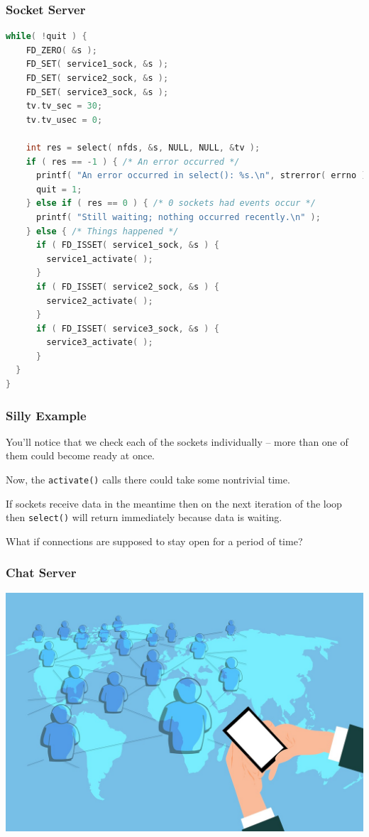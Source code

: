 \begin{frame}[fragile]
	\frametitle{Socket Server}

	\begin{lstlisting}[language=C]
while( !quit ) {
    FD_ZERO( &s );
    FD_SET( service1_sock, &s );
    FD_SET( service2_sock, &s );
    FD_SET( service3_sock, &s );
    tv.tv_sec = 30;
    tv.tv_usec = 0;
  
    int res = select( nfds, &s, NULL, NULL, &tv );
    if ( res == -1 ) { /* An error occurred */
      printf( "An error occurred in select(): %s.\n", strerror( errno ) );
      quit = 1;
    } else if ( res == 0 ) { /* 0 sockets had events occur */
      printf( "Still waiting; nothing occurred recently.\n" );
    } else { /* Things happened */
      if ( FD_ISSET( service1_sock, &s ) {
        service1_activate( ); 
      }
      if ( FD_ISSET( service2_sock, &s ) {
        service2_activate( ); 
      }
      if ( FD_ISSET( service3_sock, &s ) {
        service3_activate( ); 
      }
  }
}
\end{lstlisting}

\end{frame}


\begin{frame}
	\frametitle{Silly Example}

	You'll notice that we check each of the sockets individually -- more than one of them could become ready at once.

	Now, the \texttt{activate()} calls there could take some nontrivial time.

	If sockets receive data in the meantime then on the next iteration of the loop then \texttt{select()} will return immediately because data is waiting.

	What if connections are supposed to stay open for a period of time?

\end{frame}


\begin{frame}
	\frametitle{Chat Server}

	\begin{center}
		\includegraphics[width=\textwidth]{images/worldchat.jpg}
	\end{center}

\end{frame}

